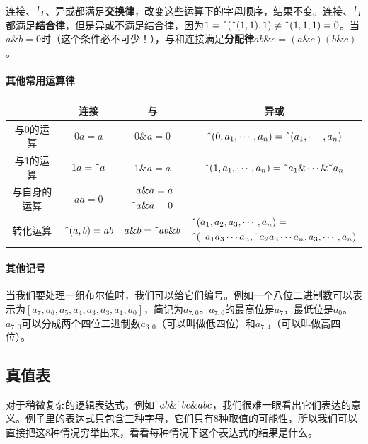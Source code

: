 连接、与、异或都满足\textbf{交换律}，改变这些运算下的字母顺序，结果不变。连接、与都满足\textbf{结合律}，但是异或不满足结合律，因为$1=\textrm{\^{}}(\textrm{\^{}}(1,1),1)\ne \textrm{\^{}}(1,1,1)=0$。当$a\&b=0$时（这个条件必不可少！），与和连接满足\textbf{分配律}$ab\&c=(a\&c)(b\&c)$。

\paragraph*{其他常用运算律}
\begin{center}
\begin{tabular}{|c|c|c|c|}
\hline
&连接&与&异或\\\hline
与0的运算&$0a=a$&$0\&a=0$&$\textrm{\^{}}(0,a_1,\cdots,a_n)=\textrm{\^{}}(a_1,\cdots,a_n)$\\\hline
与1的运算&$1a=\textrm{\~{}} a$&$1\&a=a$&$\textrm{\^{}}(1,a_1,\cdots,a_n)=\textrm{\~{}} a_1\&\cdots\&\textrm{\~{}} a_n$\\\hline
与自身的运算&$aa=0$&$\begin{aligned}a\& a&=a\\\textrm{\~{}} a\& a&=0\end{aligned}$&\\\hline
转化运算&$\textrm{\^{}}(a,b)=ab$&$a\&b=\textrm{\~{}} ab\&b$&$\begin{aligned}[]&\textrm{\^{}}(a_1,a_2,a_3,\cdots,a_n)=\\&\textrm{\^{}}(\textrm{\~{}} a_1a_3\cdots a_n,\textrm{\~{}} a_2a_3\cdots a_n,a_3,\cdots,a_n)\end{aligned}$\\\hline
\end{tabular}
\end{center}

\paragraph*{其他记号}
当我们要处理一组布尔值时，我们可以给它们编号。例如一个八位二进制数可以表示为$[a_7,a_6,a_5,a_4,a_3,a_3,a_1,a_0]$，简记为$a_{7:0}$。$a_{7:0}$的最高位是$a_7$，最低位是$a_0$。$a_{7:0}$可以分成两个四位二进制数$a_{3:0}$（可以叫做低四位）和$a_{7:4}$（可以叫做高四位）。

\subsection{真值表}
对于稍微复杂的逻辑表达式，例如$\textrm{\~{}}ab\&\textrm{\~{}}bc\&abc$，我们很难一眼看出它们表达的意义。例子里的表达式只包含三种字母，它们只有8种取值的可能性，所以我们可以直接把这8种情况穷举出来，看看每种情况下这个表达式的结果是什么。

